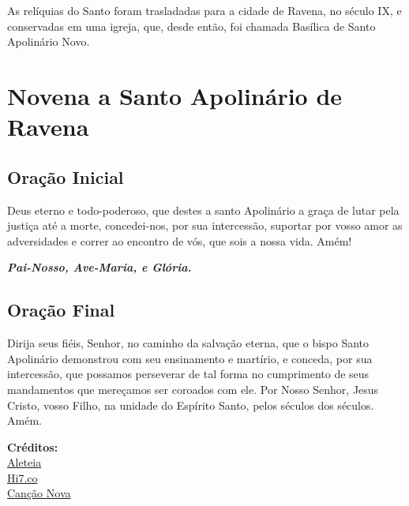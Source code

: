 \documentclass[a4paper]{article}
\begin{document}
As relíquias do Santo foram trasladadas para a cidade de Ravena, no século IX, e conservadas em uma igreja, que, desde então, foi chamada Basílica de Santo Apolinário Novo.


\newpage

  \section*{Novena a Santo Apolinário de Ravena}
  \subsection*{Oração Inicial}

Deus eterno e todo-poderoso, que destes a santo Apolinário a graça de lutar pela justiça até a morte, concedei-nos, por sua intercessão, suportar por vosso amor as adversidades e correr ao encontro de vós, que sois a nossa vida. Amém!

\begin{center}
  \textbf{\textit{Pai-Nosso, Ave-Maria, e Glória.}}
\end{center}

  \subsection*{Oração Final}

Dirija seus fiéis, Senhor, no caminho da salvação eterna,
que o bispo Santo Apolinário demonstrou com seu ensinamento e martírio,
e conceda, por sua intercessão,
que possamos perseverar de tal forma no cumprimento de seus mandamentos
que mereçamos ser coroados com ele.
Por Nosso Senhor, Jesus Cristo, vosso Filho, na unidade do Espírito Santo, pelos séculos dos séculos. Amém.
\newpage

\vfill

\centering 
\textbf{Créditos:}\\
\href{https://aleteia.org/daily-prayer/wednesday-july-20/}{Aleteia}\\
\href{https://oracoes.hi7.co/oracao-a-santo-apolinario---bispo-de-ravena-570fe9aa72199.html}{Hi7.co}\\
\href{https://santo.cancaonova.com/santo/santo-apolinario-bispo-de-ravena/}{Canção Nova}\\
\end{document}
